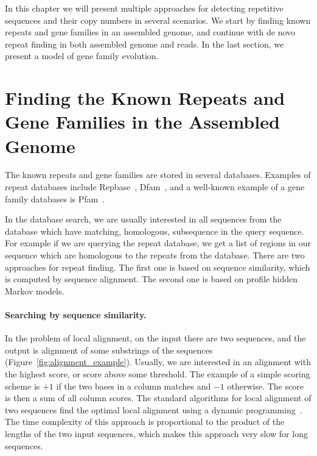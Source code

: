 In this chapter we will present multiple approaches for detecting repetitive sequences and their copy numbers in several scenarios. We start by finding known repeats and gene families in an assembled genome, and continue with de novo repeat finding in both assembled genome and reads. In the last section, we present a model of gene family evolution.

\section[Known Repeats in Assem\dots]{Finding the Known Repeats and Gene Families in the Assembled Genome}

The known repeats and gene families are stored in several databases. Examples of repeat databases include Repbase~\cite{repbase}, Dfam~\cite{dfam}, and a well-known example of a gene family databases is Pfam~\cite{pfam}.

In the database search, we are usually interested in all sequences from the database which have matching, homologous, subsequence in the query sequence. For example if we are querying the repeat database, we get a list of regions in our sequence which are homologous to the repeats from the database.
There are two approaches for repeat finding. The first one is based on sequence similarity, which is computed by sequence alignment. The second one is based on profile hidden Markov models.

\paragraph{Searching by sequence similarity.}
In the problem of local alignment, on the input there are two sequences, and the output is alignment of some substrings of the sequences (Figure~\ref{fig:alignment_example}). Usually, we are interested in an alignment with the highest score, or score above some threshold.
The example of a simple scoring scheme is $+1$ if the two bases in a column matches and $-1$ otherwise. The score is then a sum of all column scores.
The standard algorithms for local alignment of two sequences find the optimal local alignment using a dynamic programming~\cite{durbin}. The time complexity of this approach is proportional to the product of the lengths of the two input sequences, which makes this approach very slow for long sequences.

